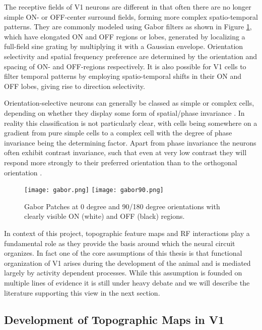 The receptive fields of V1 neurons are different in that often there are no
longer simple ON- or OFF-center surround fields, forming more complex
spatio-temporal patterns. They are commonly modeled using Gabor filters
as shown in Figure \ref{Gabor}, which have elongated ON and OFF
regions or lobes, generated by localizing a full-field sine grating
by multiplying it with a Gaussian envelope. Orientation selectivity and spatial
frequency preference are determined by the orientation and spacing of
ON- and OFF-regions respectively. It is also possible for V1 cells to
filter temporal patterns by employing spatio-temporal shifts in their
ON and OFF lobes, giving rise to direction selectivity.

Orientation-selective neurons can generally be classed as simple or
complex cells, depending on whether they display some form of
spatial/phase invariance \citep{Skottun1991}. In reality this
classification is not particularly clear, with cells being somewhere
on a gradient from pure simple cells to a complex cell with the degree
of phase invariance being the determining factor. Apart from phase
invariance the neurons often exhibit contrast invariance, such that
even at very low contrast they will respond more strongly to their
preferred orientation than to the orthogonal orientation
\citep{Sclar1982}.

\begin{figure}
	\centering \texttt{[image: gabor.png]}
        \texttt{[image: gabor90.png]}
	\caption[Oriented Gabor patches.]{Gabor Patches at 0 degree and
      90/180 degree orientations with clearly visible ON (white) and
      OFF (black) regions.}
	\label{Gabor}
\end{figure}

In context of this project, topographic feature maps and RF
interactions play a fundamental role as they provide the basis around
which the neural circuit organizes. In fact one of the core
assumptions of this thesis is that functional organization of V1
arises during the development of the animal and is mediated largely by
activity dependent processes. While this assumption is founded on
multiple lines of evidence it is still under heavy debate and we will
describe the literature supporting this view in the next section.

\subsection{Development of Topographic Maps in V1}

